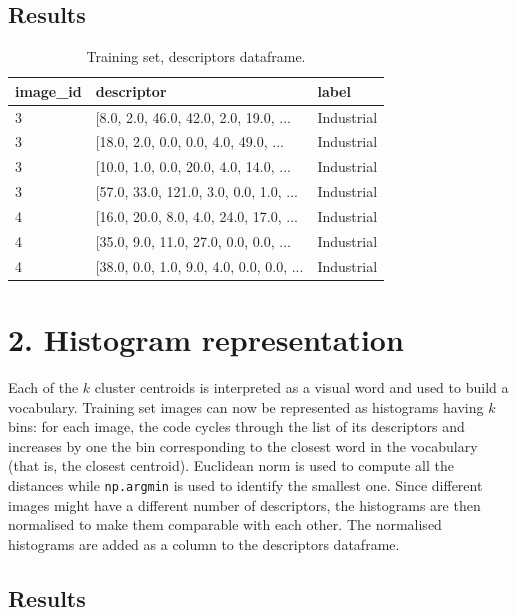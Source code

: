 \documentclass[12pt]{article}
\begin{document}
  \subsection*{Results}

	\begin{table}[H] 
		\centering
		\caption*{Training set, descriptors dataframe.}
		\begin{tabular}{lll}
			\toprule
      image\_id & descriptor & label \\
      \midrule
      3 &  [8.0, 2.0, 46.0, 42.0, 2.0, 19.0, ...    &  Industrial \\
      3 &  [18.0, 2.0, 0.0, 0.0, 4.0, 49.0, ...     &  Industrial \\
      3 &  [10.0, 1.0, 0.0, 20.0, 4.0, 14.0, ...    &  Industrial \\
      3 &  [57.0, 33.0, 121.0, 3.0, 0.0, 1.0, ...   &  Industrial \\
      4 &  [16.0, 20.0, 8.0, 4.0, 24.0, 17.0, ...   &  Industrial \\
      4 &  [35.0, 9.0, 11.0, 27.0, 0.0, 0.0, ...    &  Industrial \\
      4 &  [38.0, 0.0, 1.0, 9.0, 4.0, 0.0, 0.0, ... &  Industrial \\
			\bottomrule
		\end{tabular}
	\end{table}



  \section*{2. Histogram representation}

  Each of the \( k \) cluster centroids is interpreted as a visual word and used to build a vocabulary. Training set images can now be represented as histograms having \( k \) bins: for each image, the code cycles through the list of its descriptors and increases by one the bin corresponding to the closest word in the vocabulary (that is, the closest centroid). Euclidean norm is used to compute all the distances while \texttt{np.argmin} is used to identify the smallest one. Since different images might have a different number of descriptors, the histograms are then normalised to make them comparable with each other. The normalised histograms are added as a column to the descriptors dataframe.

  \subsection*{Results}
\end{document}
